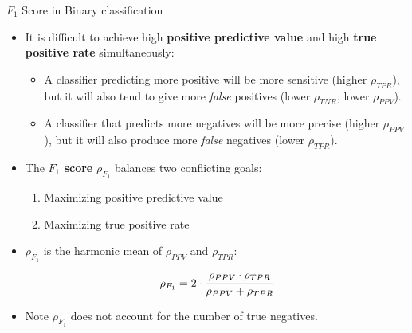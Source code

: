 \documentclass[11pt,compress,t,notes=noshow, xcolor=table]{beamer}
\begin{document}
\begin{vbframe}{$F_1$ Score in Binary classification}
	
	\small
	
	\begin{itemize}
		\item It is difficult to achieve high \textbf{positive predictive value} and 
		high \textbf{true positive rate} simultaneously:
		\begin{itemize}
			\small
			\item A classifier predicting more positive will be more 
			sensitive (higher $\rho_{TPR}$), but it will also tend to give more 
			\textit{false} positives (lower $\rho_{TNR}$, lower $\rho_{PPV}$).
			\item A classifier that predicts more negatives will be more precise 
			(higher $\rho_{PPV}$), but it will also produce more \textit{false} negatives 
			(lower $\rho_{TPR}$).
		\end{itemize}
	
	\item The \textbf{$F_1$ score} 	$\rho_{F_1}$ balances two conflicting goals:\\%
	\begin{enumerate}
		\small
		\item Maximizing positive predictive value
		\item Maximizing true positive rate \\%
	\end{enumerate}
	
	\item 	$\rho_{F_1}$ is the harmonic mean of $\rho_{PPV}$ and $\rho_{TPR}$:
	$$\rho_{F_1} = 2 \cdot \cfrac{\rho_{PPV} \cdot \rho_{TPR}}{\rho_{PPV} + 
		\rho_{TPR}}$$
	
	\item Note $\rho_{F_1}$ does not account for the number of true negatives.
	
	\end{itemize}

	\framebreak
	
	\footnotesize
	

\end{vbframe}
\end{document}
